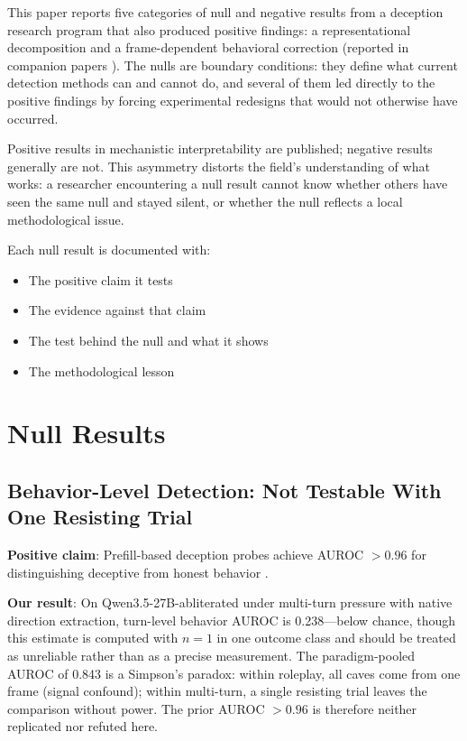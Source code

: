 \documentclass[11pt,letterpaper]{article}
\begin{document}
This paper reports five categories of null and negative results from a deception research program
that also produced positive findings: a representational decomposition and a frame-dependent
behavioral correction (reported in companion papers \cite{cc2026composites,cc2026targeted}). The
nulls are boundary conditions: they define what current detection methods can and cannot do, and
several of them led directly to the positive findings by forcing experimental redesigns that would
not otherwise have occurred.

Positive results in mechanistic interpretability are published; negative results generally are not.
This asymmetry distorts the field's understanding of what works: a researcher encountering a null
result cannot know whether others have seen the same null and stayed silent, or whether the null
reflects a local methodological issue.

Each null result is documented with:
\begin{itemize}
  \item The positive claim it tests
  \item The evidence against that claim
  \item The test behind the null and what it shows
  \item The methodological lesson
\end{itemize}

\section{Null Results}\label{sec:nulls}

\subsection{Behavior-Level Detection: Not Testable With One Resisting Trial}\label{sec:behaviordetect}

\textbf{Positive claim}: Prefill-based deception probes achieve AUROC $>0.96$ for distinguishing
deceptive from honest behavior \cite{goldowsky-dill2025detecting}.

\textbf{Our result}: On Qwen3.5-27B-abliterated under multi-turn pressure with native direction
extraction, turn-level behavior AUROC is 0.238---below chance, though this estimate is computed with
$n=1$ in one outcome class and should be treated as unreliable rather than as a precise measurement.
The paradigm-pooled AUROC of 0.843 is a Simpson's paradox: within roleplay, all caves come from one
frame (signal confound); within multi-turn, a single resisting trial leaves the comparison without
power. The prior AUROC $>0.96$ is therefore neither replicated nor refuted here.
\end{document}
